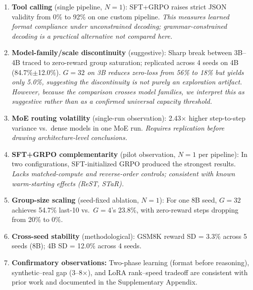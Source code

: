 \documentclass{article}
\begin{document}
\begin{enumerate}
    \item \textbf{Tool calling} (single pipeline, $N{=}1$): SFT+GRPO raises strict JSON validity from 0\% to 92\% on one custom pipeline. \emph{This measures learned format compliance under unconstrained decoding; grammar-constrained decoding is a practical alternative not compared here.}
    \item \textbf{Model-family/scale discontinuity} (suggestive): Sharp break between 3B--4B traced to zero-reward group saturation; replicated across 4 seeds on 4B (84.7\%$\pm$12.0\%). \emph{$G{=}32$ on 3B reduces zero-loss from 56\% to 18\% but yields only 5.0\%, suggesting the discontinuity is not purely an exploration artifact. However, because the comparison crosses model families, we interpret this as suggestive rather than as a confirmed universal capacity threshold.}
    \item \textbf{MoE routing volatility} (single-run observation): 2.43$\times$ higher step-to-step variance vs.\ dense models in one MoE run. \emph{Requires replication before drawing architecture-level conclusions.}
    \item \textbf{SFT+GRPO complementarity} (pilot observation, $N{=}1$ per pipeline): In two configurations, SFT-initialized GRPO produced the strongest results. \emph{Lacks matched-compute and reverse-order controls; consistent with known warm-starting effects (ReST, STaR).}
    \item \textbf{Group-size scaling} (seed-fixed ablation, $N{=}1$): For one 8B seed, $G{=}32$ achieves 54.7\% last-10 vs.\ $G{=}4$'s 23.8\%, with zero-reward steps dropping from 20\% to 0\%.
    \item \textbf{Cross-seed stability} (methodological): GSM8K reward SD = 3.3\% across 5 seeds (8B); 4B SD = 12.0\% across 4 seeds.
    \item \textbf{Confirmatory observations:} Two-phase learning (format before reasoning), synthetic--real gap (3--8$\times$), and LoRA rank--speed tradeoff are consistent with prior work and documented in the Supplementary Appendix.

\end{enumerate}
\end{document}
